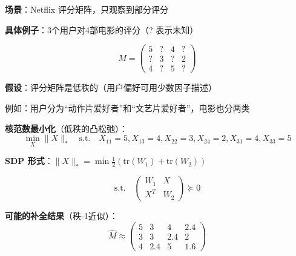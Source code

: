\documentclass[12pt, a4paper]{ctexart}
\begin{document}
\begin{blackboard}

\textbf{场景}：Netflix 评分矩阵，只观察到部分评分

\textbf{具体例子}：3个用户对4部电影的评分（? 表示未知）

\[
M = \begin{pmatrix} 
5 & ? & 4 & ? \\
? & 3 & ? & 2 \\
4 & ? & 5 & ?
\end{pmatrix}
\]

\textbf{假设}：评分矩阵是低秩的（用户偏好可用少数因子描述）

例如：用户分为``动作片爱好者''和``文艺片爱好者''，电影也分两类

\textbf{核范数最小化}（低秩的凸松弛）：
\[
\min_X \|X\|_* \quad \text{s.t.} \quad X_{11} = 5, X_{13} = 4, X_{22} = 3, X_{24} = 2, X_{31} = 4, X_{33} = 5
\]

\textbf{SDP 形式}：$\|X\|_* = \min \frac{1}{2}(\text{tr}(W_1) + \text{tr}(W_2))$

\[
\text{s.t.} \quad \begin{pmatrix} W_1 & X \\ X^T & W_2 \end{pmatrix} \succeq 0
\]

\textbf{可能的补全结果}（秩-1近似）：
\[
\hat{M} \approx \begin{pmatrix} 
5 & 3 & 4 & 2.4 \\
3 & 3 & 2.4 & 2 \\
4 & 2.4 & 5 & 1.6
\end{pmatrix}
\]

\end{blackboard}
\end{document}
